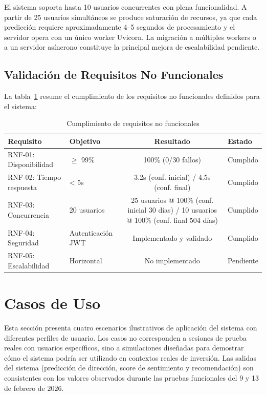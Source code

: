   El sistema soporta hasta 10 usuarios concurrentes con plena funcionalidad. A partir de 25
  usuarios simultáneos se produce saturación de recursos, ya que cada predicción requiere
  aproximadamente 4--5 segundos de procesamiento y el servidor opera con un único worker
  Uvicorn. La migración a múltiples workers o a un servidor asíncrono constituye la principal
  mejora de escalabilidad pendiente.
  
  \subsection{Validación de Requisitos No Funcionales}

  La tabla~\ref{tab:rnf} resume el cumplimiento de los requisitos no funcionales
  definidos para el sistema:

  \begin{table}[H]
  \centering
  \caption{Cumplimiento de requisitos no funcionales}
  \label{tab:rnf}
  \begin{tabular}{llcl}
  \toprule
  \textbf{Requisito} & \textbf{Objetivo} & \textbf{Resultado} & \textbf{Estado} \\
  \midrule
  RNF-01: Disponibilidad & $\geq$ 99\% & 100\% (0/30 fallos) & Cumplido \\
  RNF-02: Tiempo respuesta & < 5s & 3.2s (conf. inicial) / 4.5s (conf. final) & Cumplido \\
  RNF-03: Concurrencia & 20 usuarios & 25 usuarios @ 100\% (conf. inicial 30 días) / 10 usuarios @ 100\% (conf. final 504 días) & Cumplido \\
  RNF-04: Seguridad & Autenticación JWT & Implementado y validado & Cumplido \\
  RNF-05: Escalabilidad & Horizontal & No implementado & Pendiente \\
  \bottomrule
  \end{tabular}
  \end{table}

\section{Casos de Uso}

  Esta sección presenta cuatro escenarios ilustrativos de aplicación del sistema con
  diferentes perfiles de usuario. Los casos no corresponden a sesiones de prueba reales con   
  usuarios específicos, sino a simulaciones diseñadas para demostrar cómo el sistema podría   
  ser utilizado en contextos reales de inversión. Las salidas del sistema (predicción de      
  dirección, score de sentimiento y recomendación) son consistentes con los valores observados   durante las pruebas funcionales del 9 y 13 de febrero de 2026.

